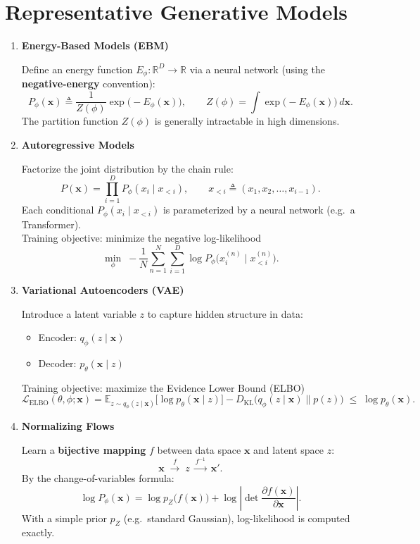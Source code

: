\documentclass[11pt,a4paper]{article}
\newcommand{\bx}{\mathbf{x}}
\begin{document}
\section{Representative Generative Models}\label{sec:taxonomy}
\begin{enumerate}

  \item \textbf{Energy-Based Models (EBM)}

  Define an energy function $E_\phi:\mathbb{R}^D\to\mathbb{R}$ via a neural network (using the \textbf{negative-energy} convention):
  \[
  P_\phi(\bx)
  \triangleq \frac{1}{Z(\phi)}\exp\!\big({-}E_\phi(\bx)\big),
  \qquad
  Z(\phi)=\int\exp\!\big({-}E_\phi(\bx)\big)\,d\bx.
  \]
  The partition function $Z(\phi)$ is generally intractable in high dimensions.

  \item \textbf{Autoregressive Models}

  Factorize the joint distribution by the chain rule:
  \[
  P(\bx)=\prod_{i=1}^{D}P_\phi(x_i\mid x_{<i}),
  \qquad
  x_{<i}\triangleq(x_1,x_2,\ldots,x_{i-1}).
  \]
  Each conditional $P_\phi(x_i\mid x_{<i})$ is parameterized by a neural network (e.g.\ a Transformer).\\
  Training objective: minimize the negative log-likelihood
  \[
  \min_\phi\;-\frac{1}{N}\sum_{n=1}^{N}\sum_{i=1}^{D}\log P_\phi\!\big(x_i^{(n)}\mid x_{<i}^{(n)}\big).
  \]

  \item \textbf{Variational Autoencoders (VAE)}

  Introduce a latent variable $z$ to capture hidden structure in data:
  \begin{itemize}
    \item Encoder: $q_\phi(z\mid \bx)$
    \item Decoder: $p_\theta(\bx\mid z)$
  \end{itemize}
  Training objective: maximize the Evidence Lower Bound (ELBO)
  \[
  \mathcal{L}_{\mathrm{ELBO}}(\theta,\phi;\bx)
  =\mathbb{E}_{z\sim q_\phi(z\mid \bx)}\!\big[\log p_\theta(\bx\mid z)\big]
  -D_{\mathrm{KL}}\!\big(q_\phi(z\mid \bx)\parallel p(z)\big)
  \;\le\;\log p_\theta(\bx).
  \]

  \item \textbf{Normalizing Flows}

  Learn a \textbf{bijective mapping} $f$ between data space $\bx$ and latent space $z$:
  \[
  \bx \;\xrightarrow{f}\; z \;\xrightarrow{f^{-1}}\; \bx'.
  \]
  By the change-of-variables formula:
  \[
  \log P_\phi(\bx)
  =\log p_Z\!\big(f(\bx)\big)
  +\log\left|\det\frac{\partial f(\bx)}{\partial \bx}\right|.
  \]
  With a simple prior $p_Z$ (e.g.\ standard Gaussian), log-likelihood is computed exactly.


\end{enumerate}
\end{document}

